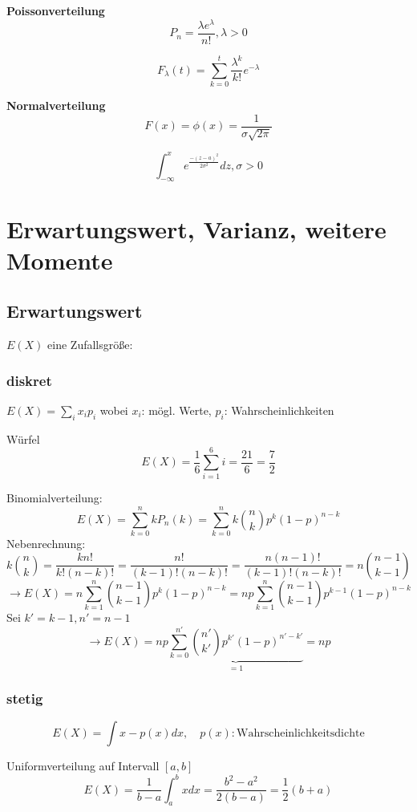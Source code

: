 \textbf{Poissonverteilung}
\[ P_n=\frac{\lambda e^{\lambda}}{n!}, \lambda > 0 \]

\[ F_{\lambda}(t)=\sum_{k=0}^t \frac{\lambda^k}{k!}e^{-\lambda} \]

\textbf{Normalverteilung}
\[ F(x)=\phi(x)=\frac{1}{\sigma\sqrt{2\pi}} \]

\[ \int_{-\infty}^x e^{\frac{-(z-a)^2}{2\sigma^2}} dz , \sigma > 0 \]

\section{Erwartungswert, Varianz, weitere Momente}
\subsection{Erwartungswert} $E(X)$ eine Zufallsgröße:\\
\subsubsection{diskret}
$E(X)=\sum_i x_i p_i$ wobei $x_i$: mögl. Werte, $p_i$: Wahrscheinlichkeiten \\

\begin{exmp}
	Würfel 
	\[ E(X)=\frac{1}{6} \sum_{i=1}^6 i = \frac{21}{6} = \frac{7}{2} \]
\end{exmp}
\begin{exmp}
	Binomialverteilung: 
	\[ E(X)= \sum_{k=0}^n k P_n(k) = \sum_{k=0}^n k \binom{n}{k} p^k(1-p)^{n-k} \] 
	Nebenrechnung:
	\[ k \binom{n}{k} = \frac{k n!}{k! (n-k)!} = \frac{n!}{(k-1)!(n-k)!} = \frac{n(n-1)!}{(k-1)!(n-k)!} = n \binom{n-1}{k-1} \] 
	\[\rightarrow E(X)= n \sum_{k=1}^{n} \binom{n-1}{k-1} p^k (1-p)^{n-k} = np \sum_{k=1}^n \binom{n-1}{k-1} p^{k-1} (1-p)^{n-k} \] 
	Sei $k'=k-1, n'=n-1$ \\
	\[ \rightarrow E(X)=np \underbrace{\sum_{k=0}^{n'} \binom{n'}{k'} p^{k'}(1-p)^{n'-k'}}_{=1} = np \]
	
\subsubsection{stetig} 
	\[ E(X)=\int x - p(x) dx , \quad p(x): \text{Wahrscheinlichkeitsdichte} \]
\end{exmp} 

\begin{exmp}
	Uniformverteilung auf Intervall $[a,b]$
	\[ E(X)= \frac{1}{b-a} \int_{a}^b x dx =  \frac{b^2 - a^2}{2(b-a)} = \frac{1}{2}(b+a) \]
\end{exmp}


